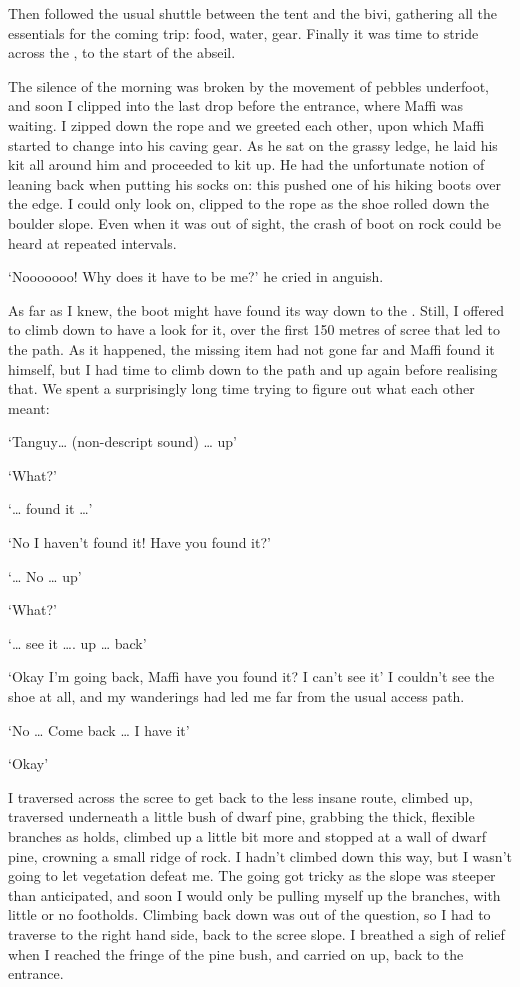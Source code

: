 Then followed the usual shuttle between the tent and the bivi, gathering all the essentials for the coming trip: food, water, gear. Finally it was time to stride across the , to the start of the abseil. 

The silence of the morning was broken by the movement of pebbles underfoot, and soon I clipped into the last drop before the entrance, where Maffi was waiting. I zipped down the rope and we greeted each other, upon which Maffi started to change into his caving gear. As he sat on the grassy ledge, he laid his kit all around him and proceeded to kit up. He had the unfortunate notion of leaning back when putting his socks on: this pushed one of his hiking boots over the edge. I could only look on, clipped to the rope as the shoe rolled down the boulder slope. Even when it was out of sight, the crash of boot on rock could be heard at repeated intervals. 

`Nooooooo! Why does it have to be me?' he cried in anguish. 

As far as I knew, the boot might have found its way down to the . Still, I offered to climb down to have a look for it, over the first 150 metres of scree that led to the  path. As it happened, the missing item had not gone far and Maffi found it himself, but I had time to climb down to the path and up again before realising that. We spent a surprisingly long time trying to figure out what each other meant: 

`Tanguy… (non-descript sound) …  up' 

`What?' 

`… found it …' 

`No I haven't found it! Have you found it?' 

 `… No … up'  
 
`What?' 

`… see it …. up … back' 

`Okay I'm going back, Maffi have you found it? I can't see it'  I couldn't see the shoe at all, and my wanderings had led me far from the usual access path.

`No … Come back … I have it'

`Okay'

I traversed across the scree to get back to the less insane route, climbed up, traversed underneath a little bush of dwarf pine, grabbing the thick, flexible branches as holds, climbed up a little bit more and stopped at a wall of dwarf pine, crowning a small ridge of rock. I hadn't climbed down this way, but I wasn't going to let vegetation defeat me. The going got tricky as the slope was steeper than anticipated, and soon I would only be pulling myself up the branches, with little or no footholds. Climbing back down was out of the question, so I had to traverse to the right  hand side, back to the scree slope. I breathed a sigh of relief when I reached the fringe of the pine bush, and carried on up, back to the entrance. 

